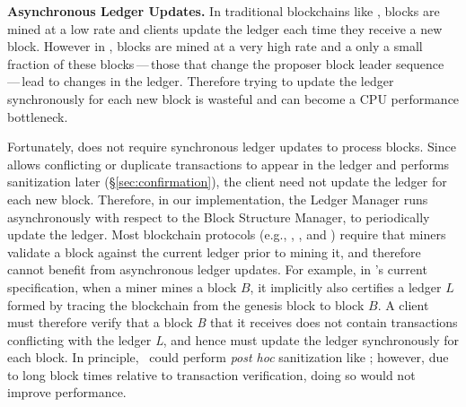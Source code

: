 

\noindent\textbf{Asynchronous Ledger Updates.}
In traditional blockchains like \bitcoin, blocks are mined at a low rate and clients update the ledger each time they receive a new block.  However in \prism, blocks are mined at a very high rate and a only a small fraction of these blocks\,---\,those that change the proposer block leader sequence\,---\,lead to changes in the ledger. Therefore trying to update the ledger synchronously for each new block is wasteful and can become a CPU performance bottleneck. 


Fortunately, \prism does not require synchronous ledger updates to process blocks. Since \prism allows conflicting or duplicate transactions to appear in the ledger and performs sanitization later (\S\ref{sec:confirmation}), the client need not update the ledger for each new block. Therefore, in our implementation, the Ledger Manager runs asynchronously with respect to the Block Structure Manager, to periodically update the ledger. 
Most blockchain protocols (e.g.,  \bitcoin, \algorand, and \bng) require that miners validate a block against the current ledger prior to mining it, and therefore cannot benefit from asynchronous ledger updates. For example, in \bitcoin's current specification, when a miner mines a block $B$, it implicitly also certifies a ledger $L$ formed by tracing the blockchain from the genesis block to block $B$. 
A \bitcoin client must therefore verify that a block \textit{B} that it receives does not contain transactions conflicting with the ledger \textit{L}, and hence must update the ledger synchronously for each block. 
In principle, \bitcoin~could perform \emph{post hoc} sanitization like \prism; however, due to long block times relative to transaction verification, doing so would not improve performance.

